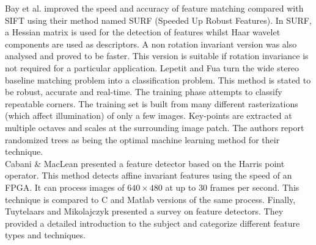 Bay et al. \cite{Bay06Surf,Bay08Speeded} improved the speed and accuracy of feature matching compared with SIFT using their method named SURF (Speeded Up Robust Features). In SURF, a Hessian matrix is used for the detection of features whilst Haar wavelet components are used as descriptors. A non rotation invariant version was also analysed and proved to be faster. This version is suitable if rotation invariance is not required for a particular application. Lepetit and Fua \cite{Lepetit06Keypoint} turn the wide stereo baseline matching problem into a classification problem. This method is stated to be robust, accurate and real-time. The training phase attempts to classify repeatable corners. The training set is built from many different rasterizations (which affect illumination) of only a few images. Key-points are extracted at multiple octaves and scales at the surrounding image patch. The authors report randomized trees as being the optimal machine learning method for their technique. \\


Cabani \& MacLean \cite{Cabani07Implementation} presented a feature detector based on the Harris point operator. This method detects affine invariant features using the speed of an FPGA. It can process images of $640\times 480$ at up to 30 frames per second. This technique is compared to C and Matlab versions of the same process. Finally, Tuytelaars and Mikolajczyk \cite{Tuytelaars08Local} presented a survey on feature detectors. They provided a detailed introduction to the subject and categorize different feature types and techniques. \\
